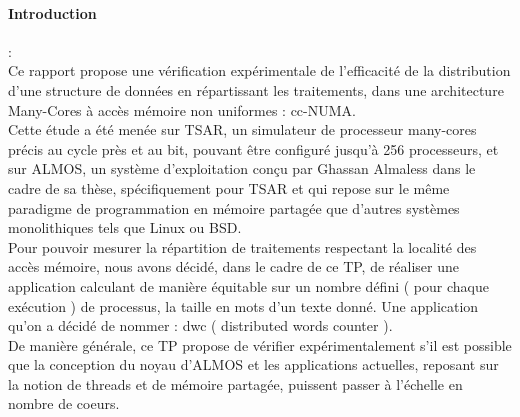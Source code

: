 \paragraph{Introduction}:\\

Ce rapport propose une vérification expérimentale de l'efficacité de la distribution d'une structure de données en répartissant les traitements, dans une architecture Many-Cores à accès mémoire non uniformes : cc-NUMA.\\

Cette étude a été menée sur TSAR, un simulateur de processeur many-cores précis au cycle près et au bit, pouvant être configuré jusqu'à 256 processeurs, et sur ALMOS, un système d'exploitation conçu par Ghassan Almaless dans le cadre de sa thèse, spécifiquement pour TSAR et qui repose sur le même paradigme de programmation en mémoire partagée que d’autres systèmes monolithiques tels que Linux ou BSD.\\

Pour pouvoir mesurer la répartition de traitements respectant la localité des accès mémoire, nous avons décidé, dans le cadre de ce TP, de réaliser une application calculant de manière équitable sur un nombre défini ( pour chaque exécution ) de processus, la taille en mots d'un texte donné. Une application qu'on a décidé de nommer : dwc ( distributed words counter ).\\

De manière générale, ce TP propose de vérifier expérimentalement s’il est possible
que la conception du noyau d'ALMOS et les applications actuelles, reposant sur la notion de threads et de mémoire partagée, puissent passer à l’échelle en nombre de coeurs.\\

